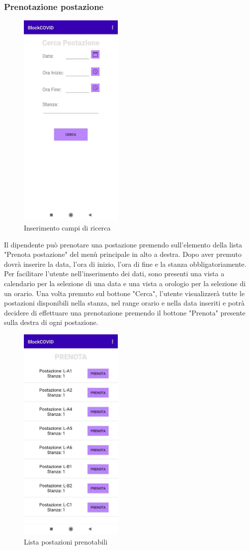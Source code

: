 	\subsubsection{Prenotazione postazione}
	\begin{figure}[H]
		\centering
		\includegraphics[width=5cm]{res/images/cerca.png}
		\caption{Inserimento campi di ricerca}
	\end{figure}
	Il dipendente può prenotare una postazione premendo sull'elemento della lista "Prenota postazione" del menù principale in alto a destra.
	Dopo aver premuto dovrà inserire la data, l'ora di inizio, l'ora di fine e la stanza obbligatoriamente. Per facilitare l'utente nell'inserimento dei dati, sono presenti una vista a calendario per la selezione di una data e una vista a orologio per la selezione di un orario. Una volta premuto sul bottone "Cerca", l’utente visualizzerà tutte le postazioni disponibili nella stanza, nel range orario e nella data inseriti e potrà decidere di effettuare una prenotazione premendo il bottone "Prenota" presente sulla destra di ogni postazione.
	\begin{figure}[H]
		\centering
		\includegraphics[width=5cm]{res/images/ListaPostazioniDaPrenotare.png}
		\caption{Lista postazioni prenotabili}
	\end{figure}
	
